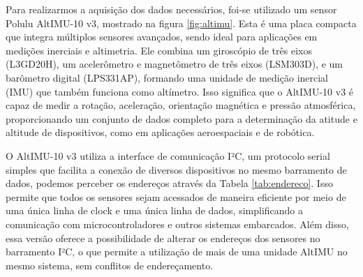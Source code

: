 \documentclass[
	12pt,				%
	openright,			%
	oneside,			%
	a4paper,			%
	english,			%
	brazil				%
	]{abntex2}
\begin{document}
Para realizarmos a aquisição dos dados necessários, foi-se utilizado um sensor Polulu AltIMU-10 v3, mostrado na figura \ref{fig:altimu}. Esta é uma placa compacta que integra múltiplos sensores avançados, sendo ideal para aplicações em medições inerciais e altimetria. Ele combina um giroscópio de três eixos (L3GD20H), um acelerômetro e magnetômetro de três eixos (LSM303D), e um barômetro digital (LPS331AP), formando uma unidade de medição inercial (IMU) que também funciona como altímetro. Isso significa que o AltIMU-10 v3 é capaz de medir a rotação, aceleração, orientação magnética e pressão atmosférica, proporcionando um conjunto de dados completo para a determinação da atitude e altitude de dispositivos, como em aplicações aeroespaciais e de robótica.

O AltIMU-10 v3 utiliza a interface de comunicação I²C, um protocolo serial simples que facilita a conexão de diversos dispositivos no mesmo barramento de dados, podemos perceber os endereços através da Tabela \ref{tab:endereco}. Isso permite que todos os sensores sejam acessados de maneira eficiente por meio de uma única linha de clock e uma única linha de dados, simplificando a comunicação com microcontroladores e outros sistemas embarcados. Além disso, essa versão oferece a possibilidade de alterar os endereços dos sensores no barramento I²C, o que permite a utilização de mais de uma unidade AltIMU no mesmo sistema, sem conflitos de endereçamento.

\begin{table}[]
	\caption{Tabela de endereçamento de cada Barramento I²C}
	\label{tab:endereco}
\end{table}
\end{document}
